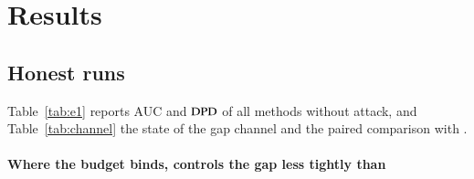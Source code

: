 \section{Results}\label{sec:results}




\subsection{Honest runs}\label{sec:main}

Table~\ref{tab:e1} reports AUC and $\mathrm{DPD}$ of all methods without attack, and Table~\ref{tab:channel} the state of the gap channel and the paired comparison with \clamp{}.

\paragraph{Where the budget binds, \rt{} controls the gap less tightly than \clamp{}}
